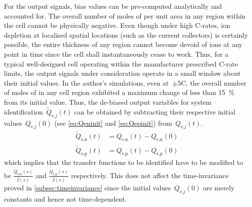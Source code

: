 For the output signals, bias  values can be pre-computed analytically and
accounted for.  The overall number  of moles of   per unit area  in any
region within  the cell cannot  be physically  negative. Even though  under high
C-rates,  ion depletion  at localised  spatial  locations (such  as the  current
collectors) is  certainly possible,  the entire thickness  of any  region cannot
become devoid of ions at any point  in time since the cell shall instantaneously
cease  to work.  Thus, for  a typical  well-designed cell  operating within  the
manufacturer prescribed  C-rate limits,  the output signals  under consideration
operate  in  a  small  window  about  their  initial  values.  In  the  author's
simulations, even  at~$\pm$5C, the overall  number of moles of   in any
cell region exhibited  a maximum change of less than  \SI{15}{\percent} from its
initial value. Thus,  the de-biased output variables  for system identification~$\widetilde{Q}_{\text{e,}j}(t)$ can be obtained  by subtracting their respective
initial values~$Q_{\text{e,}j}(0)$ (see \cref{eq:Qeninit} and \cref{eq:Qepinit})
from~$Q_{\text{e,}j}(t)$.
\begin{align}
    \widetilde{Q}_\text{e,n}(t) & = {Q}_\text{e,n}(t) - {Q}_\text{e,n}(0) \\
    \widetilde{Q}_\text{e,p}(t) & = {Q}_\text{e,p}(t) - {Q}_\text{e,p}(0)
\end{align}
which  implies   that  the   transfer  functions  to   be  identified   have  to
be   modified   to   be   $\frac{\widetilde{Q}_\text{e,n}(s)}{\bar{I}(s)}$   and
$\frac{\widetilde{Q}_\text{e,p}(s)}{\bar{I}(s)}$  respectively.  This  does  not
affect  the  time-invariance  proved in \cref{subsec:timeinvariance}  since  the
initial  values~$Q_{\text{e,}j}(0)$  are   merely  constants  and   hence  not
time-dependent.

